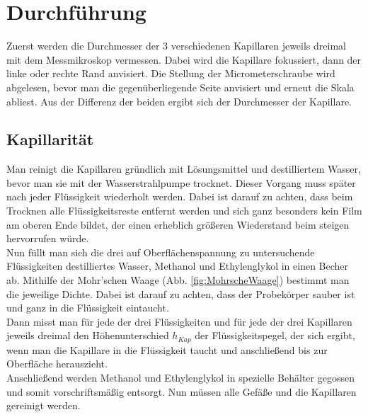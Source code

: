 \documentclass[12pt,a4paper,titlepage,headinclude,bibtotoc]{scrartcl}
\begin{document}
\section{Durchführung}
\label{sec:durchfuehrung}
Zuerst werden die Durchmesser der 3 verschiedenen Kapillaren jeweils dreimal mit dem Messmikroskop vermessen.
Dabei wird die Kapillare fokussiert, dann der linke oder rechte Rand anvisiert.
Die Stellung der Micrometerschraube wird abgelesen, bevor man die gegenüberliegende Seite anvisiert und erneut die Skala abliest.
Aus der Differenz der beiden ergibt sich der Durchmesser der Kapillare.

\subsection{Kapillarität}
Man reinigt die Kapillaren gründlich mit Lösungsmittel und destilliertem Wasser, bevor man sie mit der Wasserstrahlpumpe trocknet.
Dieser Vorgang muss später nach jeder Flüssigkeit wiederholt werden.
Dabei ist darauf zu achten, dass beim Trocknen alle Flüssigkeitsreste entfernt werden und sich ganz besonders kein Film am oberen Ende bildet, der einen erheblich größeren Wiederstand beim steigen hervorrufen würde.\\
Nun füllt man sich die drei auf Oberflächenspannung zu untersuchende Flüssigkeiten destilliertes Wasser, Methanol und Ethylenglykol in einen Becher ab.
Mithilfe der Mohr'schen Waage (Abb. \ref{fig:MohrscheWaage}) bestimmt man die jeweilige Dichte.
Dabei ist darauf zu achten, dass der Probekörper sauber ist und ganz in die Flüssigkeit eintaucht.\\
Dann misst man für jede der drei Flüssigkeiten und für jede der drei Kapillaren jeweils dreimal den Höhenunterschied $h_{Kap}$ der Flüssigkeitspegel, der sich ergibt, wenn man die Kapillare in die Flüssigkeit taucht und anschließend bis zur Oberfläche herauszieht.\\
Anschließend werden Methanol und Ethylenglykol in spezielle Behälter gegossen und somit vorschriftsmäßig entsorgt.
Nun müssen alle Gefäße und die Kapillaren gereinigt werden.
\end{document}
